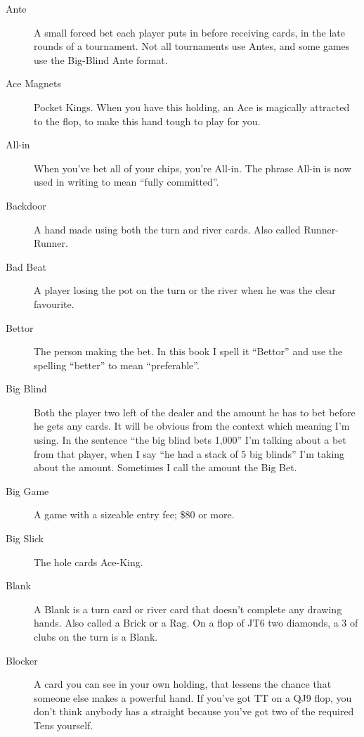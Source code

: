 \begin{description}

\item[Ante] A small forced bet each player puts in before receiving
cards, in the late rounds of a tournament. Not all tournaments use
Antes, and some games use the Big-Blind Ante format.

\item[Ace Magnets] Pocket Kings. When you have this holding, an Ace is
magically attracted to the flop, to make this hand tough to play for
you.

\item[All-in] When you've bet all of your chips, you're All-in. The
phrase All-in is now used in writing to mean ``fully committed''.

\item[Backdoor] A hand made using both the turn and river cards. Also
called Runner-Runner.

\item[Bad Beat] A player losing the pot on the turn or the river when
he was the clear favourite.

\item[Bettor] The person making the bet. In this book I spell it ``Bettor''
and use the spelling ``better'' to mean ``preferable''.

\item[Big Blind] Both the player two left of the dealer and the amount
he has to bet before he gets any cards. It will be obvious from the
context which meaning I'm using. In the sentence ``the big blind bets
1,000'' I'm talking about a bet from that player, when I say ``he had
a stack of 5 big blinds'' I'm taking about the amount. Sometimes I
call the amount the Big Bet.

\item[Big Game] A game with a sizeable entry fee; \$80 or more.

\item[Big Slick] The hole cards Ace-King.

\item[Blank] A Blank is a turn card or river card that doesn't
complete any drawing hands. Also called a Brick or a Rag. On a flop of
JT6 two diamonds, a 3 of clubs on the turn is a Blank.

\item[Blocker] A card you can see in your own holding, that lessens
the chance that someone else makes a powerful hand. If you've got TT
on a QJ9 flop, you don't think anybody has a straight because you've
got two of the required Tens yourself.


\end{description}
